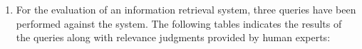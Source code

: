 \documentclass[exam, sectionseven, solution]{acAssignment}
\begin{document}
\begin{enumerate}
        :
        Complete the formulas below by filling in nominator and denominator of the fractions.
        
        \newcommand*{\myFracField}[1]{%
            \acIfSolution%
                {\begin{minipage}{7cm}%
                    \centering\textcolor{acSolution}{#1}%
                    \end{minipage}}%
                {\hspace{7cm}}}
        
        \vspace{1cm}
        \begin{align*}
            \text{Precision} &= \dfrac
                {\myFracField{\textbf{TP}}}
                {\myFracField{\textbf{TP} + \textbf{FP}}}
            \\[2cm]
            \text{Recall} &= \dfrac
                {\myFracField{\textbf{TP}}}
                {\myFracField{\textbf{TP} + \textbf{FN}}}
            \\[2cm]
            \text{Accuracy} &= \dfrac
                {\myFracField{\textbf{TP} + \textbf{TN}}}
                {\myFracField{\textbf{TP} + \textbf{FP} + \textbf{FN} + \textbf{TN}}}
        \end{align*}
        \vspace{\fill}
    
    \clearpage
    \item For the evaluation of an information retrieval system, three queries have been performed against the system.
        The following tables indicates the results of the queries along with relevance judgments provided by human experts:
        

\end{enumerate}
\end{document}
